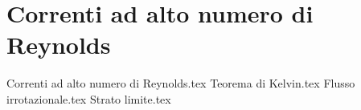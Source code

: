 %
\chapter{Correnti ad alto numero di Reynolds} 
%
{Correnti ad alto numero di Reynolds.tex}
{Teorema di Kelvin.tex}
{Flusso irrotazionale.tex}
{Strato limite.tex}